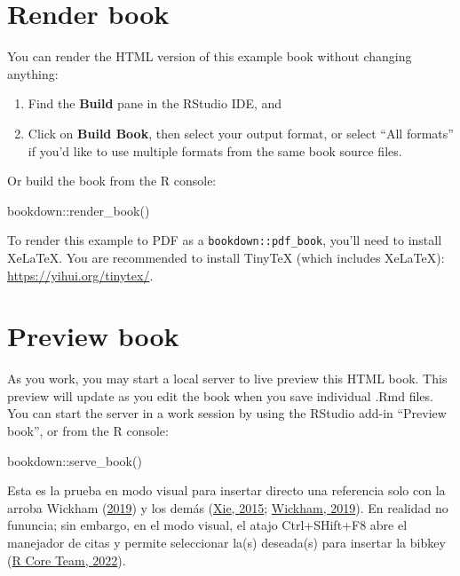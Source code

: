 \documentclass[
  12pt,
]{book}
\newenvironment{Shaded}{\begin{snugshade}}{\end{snugshade}}
\newcommand{\FunctionTok}[1]{\textcolor[rgb]{0.00,0.00,0.00}{#1}}
\newcommand{\NormalTok}[1]{#1}
\newcommand{\SpecialCharTok}[1]{\textcolor[rgb]{0.00,0.00,0.00}{#1}}
\theoremstyle{definition}
\theoremstyle{definition}
\theoremstyle{definition}
\theoremstyle{definition}
\theoremstyle{remark}
\begin{document}
\hypertarget{render-book}{%
\section{Render book}\label{render-book}}

You can render the HTML version of this example book without changing anything:

\begin{enumerate}
\def\labelenumi{\arabic{enumi}.}
\item
  Find the \textbf{Build} pane in the RStudio IDE, and
\item
  Click on \textbf{Build Book}, then select your output format, or select ``All formats'' if you'd like to use multiple formats from the same book source files.
\end{enumerate}

Or build the book from the R console:

\begin{Shaded}
\begin{Highlighting}[]
\NormalTok{bookdown}\SpecialCharTok{::}\FunctionTok{render\_book}\NormalTok{()}
\end{Highlighting}
\end{Shaded}

To render this example to PDF  as a \texttt{bookdown::pdf\_book}, you'll need to install XeLaTeX. You are recommended to install TinyTeX (which includes XeLaTeX): \url{https://yihui.org/tinytex/}.

\hypertarget{preview-book}{%
\section{\texorpdfstring{Preview book }{Preview book }}\label{preview-book}}

As you work, you may start a local server to live preview this HTML book. This preview will update as you edit the book when you save individual .Rmd files. You can start the server in a work session by using the RStudio add-in ``Preview book'', or from the R console:

\begin{Shaded}
\begin{Highlighting}[]
\NormalTok{bookdown}\SpecialCharTok{::}\FunctionTok{serve\_book}\NormalTok{()}
\end{Highlighting}
\end{Shaded}

Esta es la prueba en modo visual para insertar directo una referencia solo con la arroba Wickham (\protect\hyperlink{ref-wickham2019Advanced}{2019}) y los demás (\protect\hyperlink{ref-xie2015}{Xie, 2015}; \protect\hyperlink{ref-wickham2019Advanced}{Wickham, 2019}). En realidad no fununcia; sin embargo, en el modo visual, el atajo Ctrl+SHift+F8 abre el manejador de citas y permite seleccionar la(s) deseada(s) para insertar la bibkey (\protect\hyperlink{ref-R-base}{R Core Team, 2022}).
\end{document}
